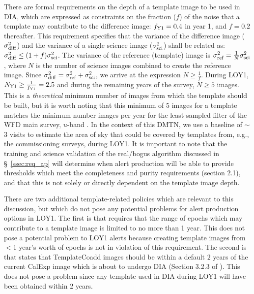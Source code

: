 \documentclass[DM,toc]{lsstdoc}
\begin{document}
There are formal requirements on the depth of a template image to be used in DIA, which are expressed as constraints on the fraction ($f$) of the noise that a template may contribute to the difference image: $f_{\rm Y1}=0.4$ in year 1, and $f=0.2$ thereafter.
This requirement specifies that the variance of the difference image ($\sigma_{\rm diff}^2$) and the variance of a single science image ($\sigma_{\rm sci}^2$) shall be related as: $\sigma_{\rm diff}^2 \leq (1+f)\sigma_{\rm sci}^2$.
The variance of the reference (template) image is $\sigma_{\rm ref}^2 = \frac{1}{N} \sigma_{\rm sci}^2$, where $N$ is the number of science images combined to create the reference image.
Since $\sigma_{\rm diff}^2 = \sigma_{\rm ref}^2 + \sigma_{\rm sci}^2$, we arrive at the expression $N \geq \frac{1}{f}$.
During LOY1, $N_{\rm Y1} \geq \frac{1}{f_{\rm Y1}} = 2.5$ and during the remaining years of the survey, $N \geq 5$ images.
This is a {\em theoretical} minimum number of images from which the template should be built, but it is worth noting that this minimum of $5$ images for a template matches the minimum number images per year for the least-sampled filter of the WFD main survey, $u$-band \citep{Ivezi__2019}.
In the context of this DMTN, we use a baseline of $\sim$3 visits to estimate the area of sky that could be covered by templates from, e.g., the commissioning surveys, during LOY1.
It is important to note that the training and science validation of the real/bogus algorithm discussed in \S~\ref{ssec:req_ap} will determine when alert production will be able to provide thresholds which meet the completeness and purity requirements (section 2.1), and that this is not solely or directly dependent on the template image depth.

There are two additional template-related policies which are relevant to this discussion, but which do not pose any potential problems for alert production options in LOY1.
The first is that  requires that the range of epochs which may contribute to a template image is limited to no more than 1 year.
This does not pose a potential problem to LOY1 alerts because creating template images from $<$1 year's worth of epochs is not in violation of this requirement.
The second is that  states that TemplateCoadd images should be within a default $2$ years of the current CalExp image which is about to undergo DIA (Section 3.2.3 of \cite{LDM-151}).
This does not pose a problem since any template used in DIA during LOY1 will have been obtained within 2 years.
\end{document}

